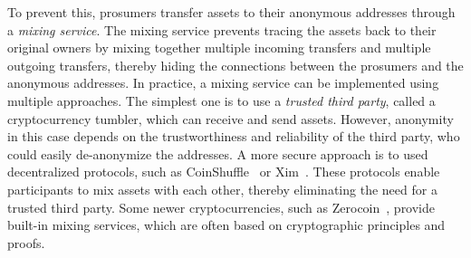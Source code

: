 To prevent this, prosumers transfer assets to their anonymous addresses through a \emph{mixing service}. 
The mixing service prevents tracing the assets back to their original owners by mixing together multiple incoming transfers and multiple outgoing transfers, thereby hiding the connections between the prosumers and the anonymous addresses.
In practice, a mixing service can be implemented using multiple approaches.
The simplest one is to use a \emph{trusted third party}, called a cryptocurrency tumbler, which can receive and send assets.
However, anonymity in this case depends on the trustworthiness and reliability of the third party, who could easily de-anonymize the addresses.
A more secure approach is to used decentralized protocols, such as CoinShuffle~\cite{ruffing2014coinshuffle} or Xim~\cite{bissias2014sybil}.
These protocols enable participants to mix assets with each other, thereby eliminating the need for a trusted third party. %
Some newer cryptocurrencies, such as Zerocoin~\cite{miers2013zerocoin},  provide built-in mixing services, which are often based on cryptographic principles and proofs.

